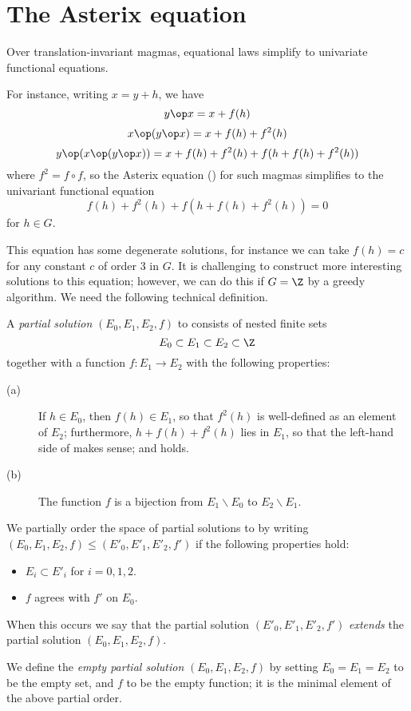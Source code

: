 \section{The Asterix equation}\label{asterix-section}

Over translation-invariant magmas, equational laws simplify to univariate functional equations.

For instance, writing $x = y+h$, we have
$$ y \op x = x + f(h)$$
$$ x \op (y \op x) = x + f(h) + f^2(h)$$
$$ y \op (x \op (y \op x)) = x + f(h) + f^2(h) + f( h + f(h) + f^2(h) )$$
where $f^2 = f \circ f$, so the Asterix equation () for such magmas simplifies to the univariant functional equation
\begin{equation}\label{fh}
   f(h) + f^2(h) + f( h + f(h) + f^2(h) ) = 0
\end{equation}
for $h \in G$.

This equation has some degenerate solutions, for instance we can take $f(h) = c$ for any constant $c$ of order $3$ in $G$.  It is challenging to construct more interesting solutions to this equation; however, we can do this if $G=\Z$ by a greedy algorithm.  We need the following technical definition.

\begin{definition}\label{partial-solution}  A \emph{partial solution} $(E_0, E_1, E_2, f)$ to  consists of nested finite sets
$$ E_0 \subset E_1 \subset E_2 \subset \Z$$ together with a function $f: E_1 \to E_2$ with the following properties:
\begin{description}
  \item[(a)] If $h \in E_0$, then $f(h) \in E_1$, so that $f^2(h)$ is well-defined as an element of $E_2$; furthermore, $h + f(h) + f^2(h)$ lies in $E_1$, so that the left-hand side of  makes sense; and  holds.
  \item[(b)] The function $f$ is a bijection from $E_1 \backslash E_0$ to $E_2 \backslash E_1$.
\end{description}

We partially order the space of partial solutions to  by writing $(E_0, E_1, E_2, f) \leq (E'_0, E'_1, E'_2, f')$ if the following properties hold:
\begin{itemize}
  \item $E_i \subset E'_i$ for $i=0,1,2$.
  \item $f$ agrees with $f'$ on $E_0$.
\end{itemize}
When this occurs we say that the partial solution $(E'_0, E'_1, E'_2, f')$ \emph{extends} the partial solution $(E_0, E_1, E_2, f)$.

We define the \emph{empty partial solution} $(E_0,E_1,E_2,f)$ by setting $E_0=E_1=E_2$ to be the empty set, and $f$ to be the empty function; it is the minimal element of the above partial order.
\end{definition}



